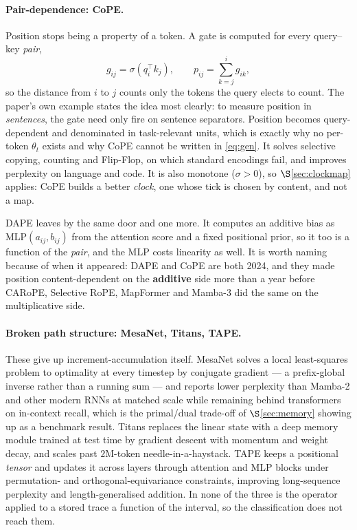 \documentclass[11pt]{article}
\begin{document}
\paragraph{Pair-dependence: CoPE.} Position stops being a property of a token. A gate
is computed for every query--key \emph{pair},
\[
  g_{ij} = \sigma(q_i^{\!\top}k_j), \qquad p_{ij} = \sum_{k=j}^{i} g_{ik},
\]
so the distance from $i$ to $j$ counts only the tokens the query elects to count. The
paper's own example states the idea most clearly: to measure position in
\emph{sentences}, the gate need only fire on sentence separators. Position becomes
query-dependent and denominated in task-relevant units, which is exactly why no
per-token $\theta_t$ exists and why CoPE cannot be written in \eqref{eq:gen}. It
solves selective copying, counting and Flip-Flop, on which standard encodings fail,
and improves perplexity on language and code. It is also monotone ($\sigma>0$), so
$\S$\ref{sec:clockmap} applies: CoPE builds a better \emph{clock}, one whose tick is
chosen by content, and not a map.

DAPE leaves by the same door and one more. It computes an additive bias as
$\mathrm{MLP}(a_{ij}, b_{ij})$ from the attention score and a fixed positional prior,
so it too is a function of the \emph{pair}, and the MLP costs linearity as well. It
is worth naming because of when it appeared: DAPE and CoPE are both 2024, and they
made position content-dependent on the \textbf{additive} side more than a year before
CARoPE, Selective RoPE, MapFormer and Mamba-3 did the same on the multiplicative
side.

\paragraph{Broken path structure: MesaNet, Titans, TAPE.} These give up
increment-accumulation itself. MesaNet solves a local least-squares problem to
optimality at every timestep by conjugate gradient --- a prefix-global inverse rather
than a running sum --- and reports lower perplexity than Mamba-2 and other modern RNNs
at matched scale while remaining behind transformers on in-context recall, which is
the primal/dual trade-off of $\S$\ref{sec:memory} showing up as a benchmark result.
Titans replaces the linear state with a deep memory module trained at test time by
gradient descent with momentum and weight decay, and scales past $2$M-token
needle-in-a-haystack. TAPE keeps a positional \emph{tensor} and updates it across
layers through attention and MLP blocks under permutation- and
orthogonal-equivariance constraints, improving long-sequence perplexity and
length-generalised addition. In none of the three is the operator applied to a stored
trace a function of the interval, so the classification does not reach them.
\end{document}
